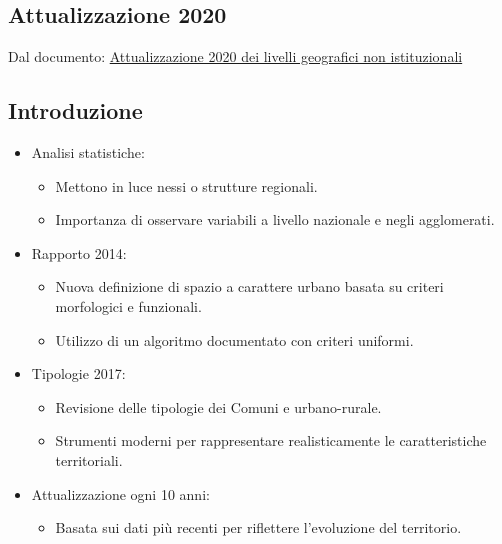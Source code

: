 \documentclass{article}
\begin{document}
\subsection{Attualizzazione 2020}
Dal documento: \href{https://github.com/matteofrongillo/passerella/blob/main/Geografia/media/052_Materiale OLE_BFS SpazioCarattereUrbano Attualizzazione-2020 8pp_BFS_SpazioCaratter.pdf?raw=true}
{Attualizzazione 2020 dei livelli geografici non istituzionali}

\subsection{Introduzione}
\begin{itemize}
    \item Analisi statistiche:
    \begin{itemize}
        \item Mettono in luce nessi o strutture regionali.
        \item Importanza di osservare variabili a livello nazionale e negli agglomerati.
    \end{itemize}
    \item Rapporto 2014:
    \begin{itemize}
        \item Nuova definizione di spazio a carattere urbano basata su criteri morfologici e
            funzionali.
        \item Utilizzo di un algoritmo documentato con criteri uniformi.
    \end{itemize}
    \item Tipologie 2017:
    \begin{itemize}
        \item Revisione delle tipologie dei Comuni e urbano-rurale.
        \item Strumenti moderni per rappresentare realisticamente le caratteristiche
            territoriali.
    \end{itemize}
    \item Attualizzazione ogni 10 anni:
    \begin{itemize}
        \item Basata sui dati più recenti per riflettere l'evoluzione del territorio.
    \end{itemize}
\end{itemize}
\end{document}
